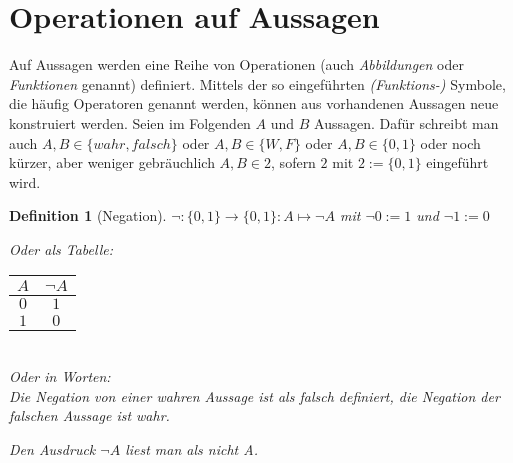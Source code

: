 \documentclass[a4paper]{article}
\newtheorem{definition}[satz]{Definition} %
\theoremstyle{nonumberplain}
\begin{document}
\section{Operationen auf Aussagen}

Auf Aussagen werden eine Reihe von Operationen (auch \textit{Abbildungen} oder \textit{Funktionen} genannt) definiert. Mittels der so eingeführten \textit{(Funktions-)} Symbole, die häufig Operatoren genannt werden, können aus vorhandenen Aussagen neue konstruiert werden. Seien im Folgenden $A$ und $B$ Aussagen. Dafür schreibt man auch $A,B \in \lbrace wahr, falsch \rbrace$ oder $A,B \in \lbrace W,F \rbrace$ oder $A,B \in \lbrace 0, 1 \rbrace$ oder noch kürzer, aber weniger gebräuchlich $A,B \in 2$, sofern $2$ mit $2:= \lbrace 0, 1 \rbrace$ eingeführt wird.

\begin{definition}[Negation]
$\neg:\lbrace 0,1 \rbrace\to \lbrace 0,1 \rbrace :  A \mapsto \neg A$ mit $\neg 0 := 1$ und
$\neg 1 := 0$
\begin{multicols}{2}
	Oder als Tabelle: \hspace{9mm}
	\begin{tabular}{|c|c|} %
		\hline
		$A$ & $\neg A$ \\
		\hline
		$0$ & $1$
		\\
		$1$ & $0$
		\\
		\hline
	\end{tabular} \\
	Oder in Worten: \\ Die Negation von einer wahren Aussage ist als falsch definiert, die Negation der falschen Aussage ist wahr.
\end{multicols}
Den Ausdruck $\neg A$ liest man als \glqq nicht A\grqq .
\end{definition}
\end{document}
